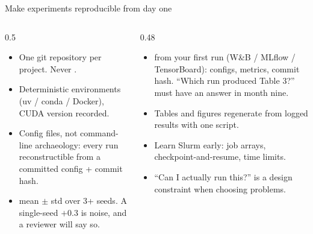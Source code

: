 \documentclass[aspectratio=169,11pt]{beamer}
\begin{document}
\begin{frame}{Make experiments reproducible from day one}
\begin{columns}[T]
\begin{column}{0.5\textwidth}
\footnotesize
\begin{itemize}
  \item One git repository per project. Never .
  \item Deterministic environments (uv / conda / Docker), CUDA version
        recorded.
  \item Config files, not command-line archaeology: every run reconstructible
        from a committed config + commit hash.
  \item {} mean $\pm$ std over 3+ seeds. A single-seed
        $+0.3$ is noise, and a reviewer will say so.
\end{itemize}
\end{column}
\begin{column}{0.48\textwidth}
\footnotesize
\begin{itemize}
  \item {} from your first run (W\&B / MLflow /
        TensorBoard): configs, metrics, commit hash. ``Which run produced
        Table 3?'' must have an answer in month nine.
  \item Tables and figures regenerate from logged results with one script.
  \item Learn Slurm early: job arrays, checkpoint-and-resume, time limits.
  \item ``Can I actually run this?'' is a design constraint when choosing
        problems.
\end{itemize}
\end{column}
\end{columns}
\end{frame}
\end{document}
